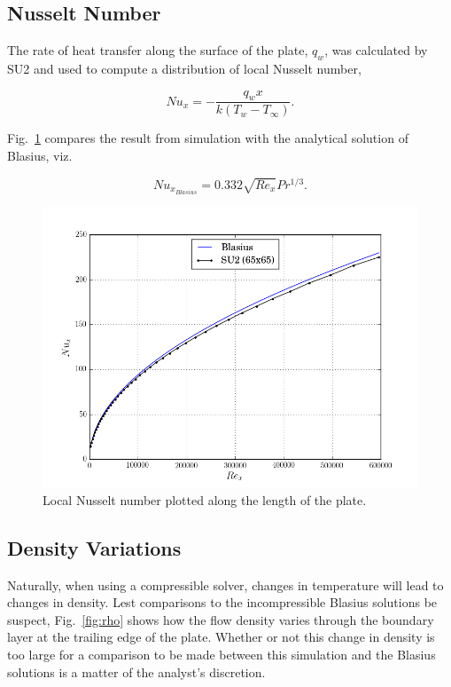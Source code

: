 \documentclass[12pt,letterpaper]{article}
\begin{document}
\subsection*{Nusselt Number}
The rate of heat transfer along the surface of the plate, $q_w$, was calculated by SU2 and used to compute a distribution of local Nusselt number,

\begin{equation*}
Nu_x = -\dfrac{q_wx}{k\left(T_w-T_\infty\right)}.
\end{equation*} 

Fig.~\ref{fig:Nu} compares the result from simulation with the analytical solution of Blasius, viz.

\begin{equation*}
Nu_{x_{Blasius}} = 0.332\sqrt{Re_x}Pr^{1/3}.
\end{equation*} 

\begin{figure}[h] 
\centering
\includegraphics[width=\linewidth]{Nu_350.png}
\caption{Local Nusselt number plotted along the length of the plate.}
\label{fig:Nu}
\end{figure}

\subsection*{Density Variations}
Naturally, when using a compressible solver, changes in temperature will lead to changes in density. Lest comparisons to the incompressible Blasius solutions be suspect, Fig.~\ref{fig:rho} shows how the flow density varies through the boundary layer at the trailing edge of the plate. Whether or not this change in density is too large for a comparison to be made between this simulation and the Blasius solutions is a matter of the analyst's discretion.
\end{document}
